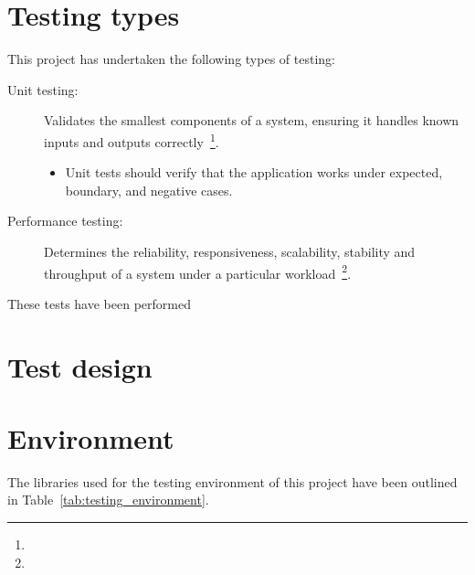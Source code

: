 \section{Testing types} {
\label{sec:testing_types}

	This project has undertaken the following types of testing:

	\begin{description}
		\item[Unit testing:] Validates the smallest components of a system, ensuring it handles known inputs and outputs correctly~\footnote{}.
			\begin{itemize}
				\item Unit tests should verify that the application works under expected, boundary, and negative cases.
			\end{itemize}
		\item[Performance testing:] Determines the reliability, responsiveness, scalability, stability and throughput of a system under a particular workload~\footnote{}.
	\end{description}


	These tests have been performed 

}

\section{Test design} {
\label{sec:test_design}





	
}

\section{Environment} {
\label{sec:testing_environment}

	The libraries used for the testing environment of this project have been outlined in Table~\ref{tab:testing_environment}.

	

}

